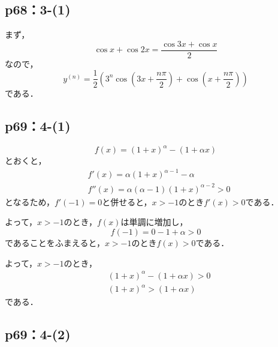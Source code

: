 \documentclass[uplatex,dvipdfmx,a4paper,10pt,fleqn]{jsarticle}
\newenvironment{tleftbar}{\begin{tbleftline}\setlength{\parindent}{1zw}}{\end{tbleftline}}
\begin{document}
\subsection*{p68：3-(1)}

\begin{tleftbar}
    まず，
    \[
        \cos x + \cos 2x = \frac{\cos 3x + \cos x}{2}
    \]
    なので，
    \[
        y^{(n)} = \frac{1}{2} \left  ( 3^n \cos \left (3x + \frac{n \pi}{2} \right)+ \cos \left (x + \frac{n \pi}{2}\right) \right)
    \]
    である．
\end{tleftbar}


\subsection*{p69：4-(1)}

\begin{tleftbar}
    \[
        f(x)=(1+x)^\alpha - (1+\alpha x)
    \]
    とおくと，
    \begin{align*} 
        &f'(x) = \alpha (1+x)^{\alpha -1} - \alpha \\
        & f''(x)= \alpha(\alpha-1) (1+x)^{\alpha -2} >0
    \end{align*} 
    となるため，$f'(-1)= 0$と併せると，$x>-1$のとき$f'(x) >0$である．

    よって，$ x>-1$のとき，$f(x)$は単調に増加し，
    \[
        f(-1)=0-1+\alpha >0
    \]
    であることをふまえると，$x>-1$のとき$f(x)>0$である．

    よって，$x>-1$のとき，
    \begin{align*} 
        & (1+x)^\alpha - (1+\alpha x)>0 \\
        & (1+x)^\alpha > (1+\alpha x)
    \end{align*} 
    である．
\end{tleftbar}


\subsection*{p69：4-(2)}
\end{document}

